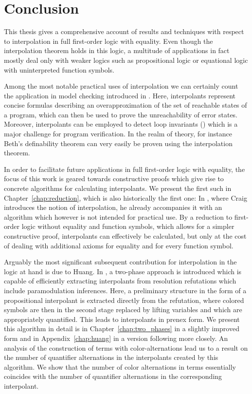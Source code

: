 \chapter{Conclusion}

This thesis gives a comprehensive account of results and techniques with respect to interpolation in full first-order logic with equality.
Even though the interpolation theorem holds in this logic, %
a multitude of applications in fact mostly deal only with weaker logics such as propositional logic or equational logic with uninterpreted function symbols.

Among the most notable practical uses of interpolation we can certainly count the application in model checking introduced in \cite{McMillan03}.
Here, interpolants represent concise formulas describing an overapproximation of the set of reachable states of a program, which can then be used to prove the unreachability of error states.
Moreover, interpolants can be employed to detect loop invariants (\cite{weissenbacher2010}) which is a major challenge for program verification.
In the realm of theory, for instance Beth's definability theorem can very easily be proven using the interpolation theorem.

In order to facilitate future applications in full first-order logic with equality, the focus of this work is geared towards constructive proofs which give rise to concrete algorithms for calculating interpolants.
We present the first such in Chapter~\ref{chap:reduction}, which is also historically the first one:
In \cite{Craig57linear,Craig57three}, where Craig introduces the notion of interpolation, he already accompanies it with an algorithm which however is not intended for practical use.
By a reduction to first-order logic without equality and function symbols, which allows for a simpler constructive proof, interpolants can effectively be calculated, but only at the cost of dealing with additional axioms for equality and for every function symbol.

Arguably the most significant subsequent contribution for interpolation in the logic at hand is due to Huang.
In \cite{Huang95}, a two-phase approach is introduced which is capable of efficiently extracting interpolants from resolution refutations which include paramodulation inferences.
Here, a preliminary structure in the form of a propositional interpolant is extracted directly from the refutation, where colored symbols are then in the second stage replaced by lifting variables and which are appropriately quantified.
This leads to interpolants in prenex form.
We present this algorithm in detail is in Chapter~\ref{chap:two_phases} in a slightly improved form and in Appendix~\ref{chap:huang} in a version following \cite{Huang95} more closely. 
An analysis of the construction of terms with color-alternations lead us to a result on the number of quantifier alternations in the interpolants created by this algorithm.
We show that the number of color alternations in terms essentially coincides with the number of quantifier alternations in the corresponding interpolant.

